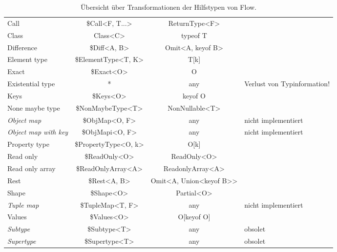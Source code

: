 \begin{table}[tbh]
  \footnotesize
  \begin{tabu} to 
    \midrule
        &      &  &  \\
    \midrule
    Call                         &  \$Call<F, T...>        & ReturnType<F>              & {} \\
    Class                        &  Class<C>               & typeof T                   & {} \\
    Difference                   &  \$Diff<A, B>           & Omit<A, keyof B>           & {} \\
    Element type                 &  \$ElementType<T, K>    & T[k]                       & {} \\
    Exact                        &  \$Exact<O>             & O                          & {} \\
    Existential type             &  *                      & any                        & Verlust von Typinformation! \\
    Keys                         &  \$Keys<O>              & keyof O                    & {} \\
    None maybe type              &  \$NonMaybeType<T>      & NonNullable<T>             & {} \\
    \textit{Object map}          &  \$ObjMap<O, F>         & any                        & nicht implementiert \\
    \textit{Object map with key} &  \$ObjMapi<O, F>        & any                        & nicht implementiert  \\
    Property type                &  \$PropertyType<O, k>   & O[k]                       & {} \\
    Read only                    &  \$ReadOnly<O>          & ReadOnly<O>                & {} \\
    Read only array              &  \$ReadOnlyArray<A>     & ReadonlyArray<A>           & {} \\
    Rest                         &  \$Rest<A, B>           & Omit<A, Union<keyof B>{>}  & {} \\
    Shape                        &  \$Shape<O>             & Partial<O>                 & {} \\
    \textit{Tuple map}           &  \$TupleMap<T, F>       & any                        & nicht implementiert \\
    Values                       &  \$Values<O>            & O[keyof O]                 & {} \\
    \textit{Subtype}             &  \$Subtype<T>           & any                        & obsolet \\
    \textit{Supertype}           &  \$Supertype<T>         & any                        & obsolet \\
    \midrule
  \end{tabu}
  \caption{Übersicht über Transformationen der Hilfstypen von Flow.}
  \label{tab:transformation-utility-types}
\end{table}

